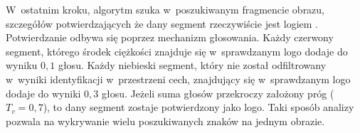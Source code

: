 W~ostatnim kroku, algorytm szuka w~poszukiwanym fragmencie obrazu, szczegółów potwierdzających że dany segment rzeczywiście jest logiem \bk. Potwierdzanie odbywa się poprzez mechanizm głosowania. Każdy czerwony segment, którego środek ciężkości znajduje się w~sprawdzanym logo dodaje do wyniku $0{,}1$ głosu. Każdy niebieski segment, który nie został odfiltrowany w~wyniki identyfikacji w~przestrzeni cech, znajdujący się w~sprawdzanym logo dodaje do wyniki $0{,}3$ głosu. Jeżeli suma głosów przekroczy założony próg ($T_{v} = 0{,}7$), to dany segment zostaje potwierdzony jako logo. Taki sposób analizy pozwala na wykrywanie wielu poszukiwanych znaków na jednym obrazie.  
